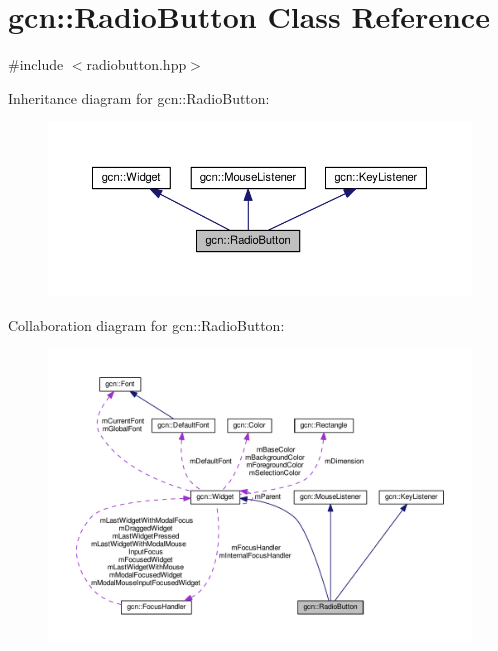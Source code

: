 \hypertarget{classgcn_1_1RadioButton}{}\section{gcn\+:\+:Radio\+Button Class Reference}
\label{classgcn_1_1RadioButton}


{\ttfamily \#include $<$radiobutton.\+hpp$>$}



Inheritance diagram for gcn\+:\+:Radio\+Button\+:\nopagebreak
\begin{figure}[H]
\begin{center}
\leavevmode
\includegraphics[width=350pt]{classgcn_1_1RadioButton__inherit__graph}
\end{center}
\end{figure}


Collaboration diagram for gcn\+:\+:Radio\+Button\+:\nopagebreak
\begin{figure}[H]
\begin{center}
\leavevmode
\includegraphics[width=350pt]{classgcn_1_1RadioButton__coll__graph}
\end{center}
\end{figure}
